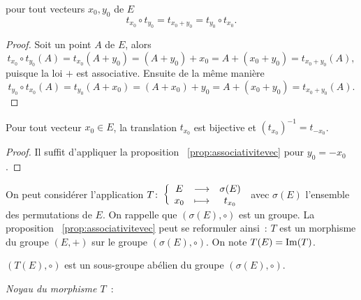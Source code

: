 \begin{prop}\label{prop:associativitevec}
  pour tout vecteurs \(x_0, y_0\) de \(E\)
  \begin{equation}
    t_{x_0} \circ t_{y_0} = t_{x_0 +y_0} = t_{y_0} \circ t_{x_0}.
  \end{equation}
\end{prop}
\begin{proof}
  Soit un point \(A\) de \(E\), alors
  \begin{equation}
    t_{x_0} \circ t_{y_0} (A)=t_{x_0}(A+y_0) = (A+y_0)+x_0 = A+(x_0+y_0) 
    =t_{x_0+y_0}(A),
  \end{equation}
  puisque la loi \(+\) est associative. Ensuite de la même manière
  \begin{equation}
    t_{y_0} \circ t_{x_0} (A)=t_{y_0}(A+x_0) = (A+x_0)+y_0 = 
    A+(x_0+y_0)=t_{x_0+y_0}(A).
  \end{equation}
\end{proof}

\begin{prop}
  Pour tout vecteur \(x_0 \in E\), la translation \(t_{x_0}\) est bijective et 
  \((t_{x_0})^{-1}=t_{-x_0}\).
\end{prop}
\begin{proof}
  Il suffit d'appliquer la proposition~
  \ref{prop:associativitevec} pour \(y_0=-x_0\).
\end{proof}

On peut considérer l'application \(T\colon \left\{\begin{array}{ccc} E & \longrightarrow &\sigma(E)\\ x_0 & \longmapsto & t_{x_0} \end{array} \right.\) 
avec \(\sigma(E)\) l'ensemble des permutations de \(E\). On rappelle que 
\((\sigma(E),\circ)\) est un groupe. La proposition~
\ref{prop:associativitevec} peut se reformuler ainsi~: \(T\) est un morphisme du 
groupe \((E,+)\) sur le groupe \((\sigma(E),\circ)\). On note 
\(T(E)=\operatorname{Im}(T)\).

\begin{prop}
  \((T(E),\circ)\) est un sous-groupe abélien du groupe \((\sigma(E),\circ)\).
\end{prop}

\emph{Noyau du morphisme \(T\)}~:


